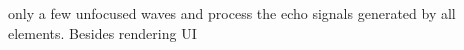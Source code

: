 only a few unfocused waves and process
the echo signals generated by
all elements.
Besides rendering \ac{UI}
